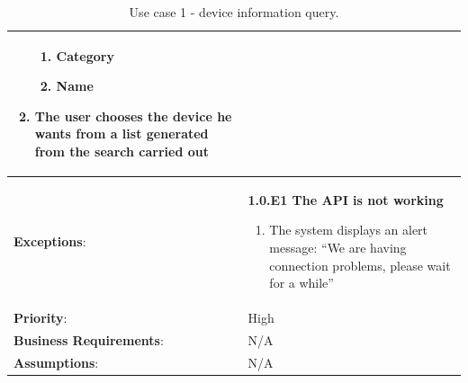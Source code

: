 \begin{table}[H]
\begin{adjustbox}{width=1.2\textwidth,center=\textwidth}
\begin{tabular}{|m{4cm}|m{12cm}|}
\begin{enumerate}
\begin{enumerate}
                    \item Category
                    \item Name
                \end{enumerate}
                \item The user chooses the device he wants from a list generated from the search carried out
            \end{enumerate} \\
            \hline
            \textbf{Exceptions}: & \textbf{1.0.E1  The API is not working}
            \begin{enumerate}
                \item The system displays an alert message: ``We are having connection problems, please wait for a while''
            \end{enumerate} \\
            \hline
            \textbf{Priority}: & High \\
            \hline
            \textbf{Business Requirements}: & N/A \\
            \hline
            \textbf{Assumptions}: & N/A \\
            \hline
        \end{tabular}
    \end{adjustbox}
    \vspace{1em}
    \caption{Use case 1 - device information query.}
    \label{table:use_case1}
\end{table}

